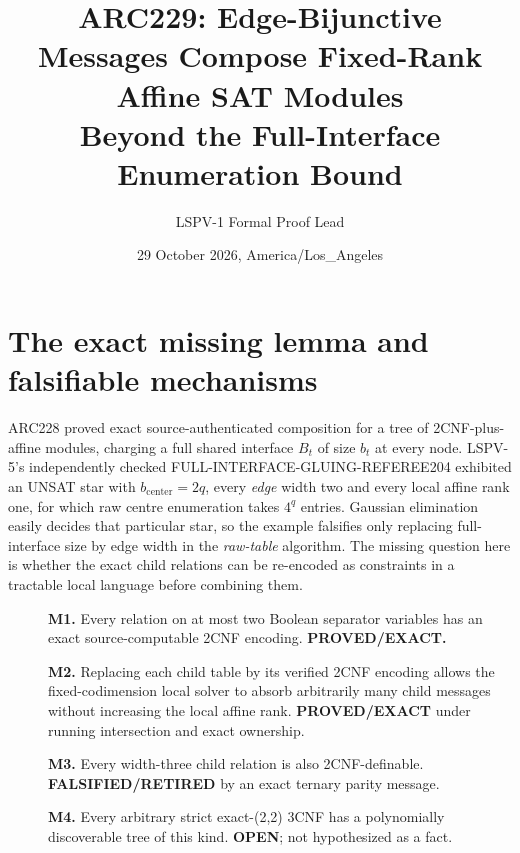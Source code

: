 \documentclass[11pt]{article}
\title{ARC229: Edge-Bijunctive Messages Compose Fixed-Rank Affine SAT Modules\\\large Beyond the Full-Interface Enumeration Bound}
\author{LSPV-1 Formal Proof Lead}
\date{29 October 2026, America/Los\_Angeles}
\begin{document}
\maketitle
\begin{center}
\end{center}

\section{The exact missing lemma and falsifiable mechanisms}
ARC228 proved exact source-authenticated composition for a tree of 2CNF-plus-affine modules, charging a full shared interface $B_t$ of size $b_t$ at every node.  LSPV-5's independently checked FULL-INTERFACE-GLUING-REFEREE204 exhibited an UNSAT star with $b_{\mathrm{center}}=2q$, every \emph{edge} width two and every local affine rank one, for which raw centre enumeration takes $4^q$ entries.  Gaussian elimination easily decides that particular star, so the example falsifies only replacing full-interface size by edge width in the \emph{raw-table} algorithm.  The missing question here is whether the exact child relations can be re-encoded as constraints in a tractable local language before combining them.

\begin{description}
\item[] \textbf{M1.} Every relation on at most two Boolean separator variables has an exact source-computable 2CNF encoding. \textbf{PROVED/EXACT.}
\item[] \textbf{M2.} Replacing each child table by its verified 2CNF encoding allows the fixed-codimension local solver to absorb arbitrarily many child messages without increasing the local affine rank. \textbf{PROVED/EXACT} under running intersection and exact ownership.
\item[] \textbf{M3.} Every width-three child relation is also 2CNF-definable. \textbf{FALSIFIED/RETIRED} by an exact ternary parity message.
\item[] \textbf{M4.} Every arbitrary strict exact-(2,2) 3CNF has a polynomially discoverable tree of this kind. \textbf{OPEN}; not hypothesized as a fact.
\end{description}
\end{document}
